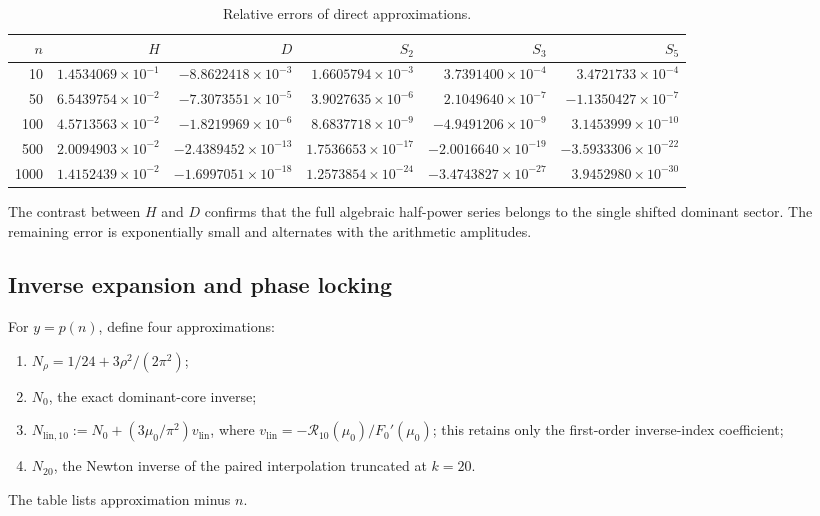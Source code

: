 \documentclass[11pt,a4paper]{article}
\numberwithin{equation}{section}
\theoremstyle{definition}
\theoremstyle{remark}
\newcommand{\Rcal}{\mathcal R}
\begin{document}
\begin{table}[htbp]
\centering
\scriptsize
\setlength{\tabcolsep}{3.8pt}
\caption{Relative errors of direct approximations.}
\label{tab:forward-errors}
\begin{tabular}{rrrrrr}
\toprule
$n$ & $H$ & $D$ & $S_2$ & $S_3$ & $S_5$\\
\midrule
10   & $ 1.4534069\!\times10^{-1}$ & $-8.8622418\!\times10^{-3}$ & $ 1.6605794\!\times10^{-3}$ & $ 3.7391400\!\times10^{-4}$ & $ 3.4721733\!\times10^{-4}$\\
50   & $ 6.5439754\!\times10^{-2}$ & $-7.3073551\!\times10^{-5}$ & $ 3.9027635\!\times10^{-6}$ & $ 2.1049640\!\times10^{-7}$ & $-1.1350427\!\times10^{-7}$\\
100  & $ 4.5713563\!\times10^{-2}$ & $-1.8219969\!\times10^{-6}$ & $ 8.6837718\!\times10^{-9}$ & $-4.9491206\!\times10^{-9}$ & $ 3.1453999\!\times10^{-10}$\\
500  & $ 2.0094903\!\times10^{-2}$ & $-2.4389452\!\times10^{-13}$ & $ 1.7536653\!\times10^{-17}$ & $-2.0016640\!\times10^{-19}$ & $-3.5933306\!\times10^{-22}$\\
1000 & $ 1.4152439\!\times10^{-2}$ & $-1.6997051\!\times10^{-18}$ & $ 1.2573854\!\times10^{-24}$ & $-3.4743827\!\times10^{-27}$ & $ 3.9452980\!\times10^{-30}$\\
\bottomrule
\end{tabular}
\end{table}

The contrast between $H$ and $D$ confirms that the full algebraic
half-power series belongs to the single shifted dominant sector.  The remaining
error is exponentially small and alternates with the arithmetic amplitudes.

\subsection{Inverse expansion and phase locking}

For $y=p(n)$, define four approximations:
\begin{enumerate}[label=(\roman*)]
\item $N_\rho=1/24+3\rho^2/(2\pi^2)$;
\item $N_0$, the exact dominant-core inverse;
\item $N_{\mathrm{lin},10}:=N_0+(3\mu_0/\pi^2)v_{\mathrm{lin}}$, where
      $v_{\mathrm{lin}}=-\Rcal_{10}(\mu_0)/F_0'(\mu_0)$; this retains only
      the first-order inverse-index coefficient;
\item $N_{20}$, the Newton inverse of the paired interpolation truncated at
      $k=20$.
\end{enumerate}
The table lists approximation minus $n$.
\end{document}
